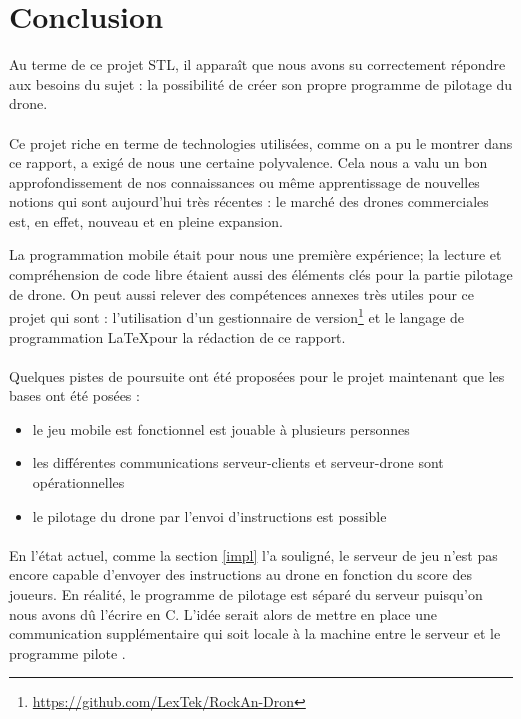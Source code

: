 \newpage
\section{Conclusion}

Au terme de ce projet STL, il apparaît que nous avons su correctement répondre aux besoins du sujet : la possibilité de créer son propre programme de pilotage du drone.

\paragraph{}
Ce projet riche en terme de technologies utilisées, comme on a pu le montrer dans ce rapport, a exigé de nous une certaine polyvalence. Cela nous a valu un bon approfondissement de nos connaissances ou même apprentissage de nouvelles notions qui sont aujourd'hui très récentes : le marché des drones commerciales est, en effet, nouveau et en pleine expansion. 

La programmation mobile \android{} était pour nous une première expérience; la lecture et compréhension de code libre étaient aussi des éléments clés pour la partie pilotage de drone. On peut aussi relever des compétences annexes très utiles pour ce projet qui sont : l'utilisation d'un gestionnaire de version\footnote{\url{https://github.com/LexTek/RockAn-Dron}} et le langage de programmation \LaTeX pour la rédaction de ce rapport.

\paragraph{}
Quelques pistes de poursuite ont été proposées pour le projet maintenant que les bases ont été posées :
\begin{itemize}
\item le jeu mobile est fonctionnel est jouable à plusieurs personnes
\item les différentes communications serveur-clients et serveur-drone sont opérationnelles
\item le pilotage du drone par l'envoi d'instructions est possible
\end{itemize}
\paragraph{}
En l'état actuel, comme la section \ref{impl} l'a souligné, le serveur de jeu n'est pas encore capable d'envoyer des instructions au drone en fonction du score des joueurs. En réalité, le programme de pilotage est séparé du serveur puisqu'on nous avons dû l'écrire en C. L'idée serait alors de mettre en place une communication supplémentaire qui soit locale à la machine entre le serveur et le \og programme pilote \fg{}.

